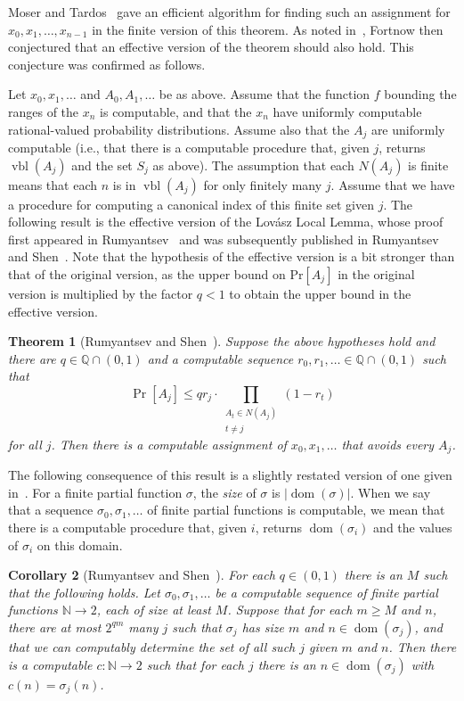 \documentclass{amsart}
\newtheorem{thm}{Theorem}[section]
\newtheorem{cor}[thm]{Corollary}
\theoremstyle{definition}
\renewcommand{\leq}{\leqslant}
\renewcommand{\geq}{\geqslant}
\DeclareMathOperator{\pr}{Pr}
\DeclareMathOperator{\vbl}{vbl}
\DeclareMathOperator{\dom}{dom}
\begin{document}
Moser and Tardos~\cite{MT} gave an efficient algorithm for finding
such an assignment for $x_0, x_1, \dots, x_{n-1}$ in the finite
version of this theorem. As noted in~\cite{RS}, Fortnow then
conjectured that an effective version of the theorem should also
hold. This conjecture was confirmed as follows.

Let $x_0,x_1,\ldots$ and $A_0, A_1,\ldots$ be as above. Assume that
the function $f$ bounding the ranges of the $x_n$ is computable, and
that the $x_n$ have uniformly computable rational-valued probability
distributions. Assume also that the $A_j$ are uniformly computable
(i.e., that there is a computable procedure that, given $j$, returns
$\vbl(A_j)$ and the set $S_j$ as above). The assumption that each
$N(A_j)$ is finite means that each $n$ is in $\vbl(A_j)$ for only
finitely many $j$. Assume that we have a procedure for computing a
canonical index of this finite set given $j$. The following result is
the effective version of the Lov\'asz Local Lemma, whose proof first
appeared in Rumyantsev~\cite{R} and was subsequently published in
Rumyantsev and Shen~\cite{RS}. Note that the hypothesis of the
effective version is a bit stronger than that of the original version,
as the upper bound on Pr$[A_j]$ in the original version is multiplied
by the factor $q < 1$ to obtain the upper bound in the effective
version.

\begin{thm}[Rumyantsev and Shen~\cite{R,RS}]
\label{RSthm}
Suppose the above hypotheses hold and there are $q \in \mathbb Q \cap
(0,1)$ and a computable sequence $r_0,r_1,\ldots \in \mathbb Q \cap
(0,1)$ such that
$$
\pr[A_j] \leq qr_j \cdot \prod_{\substack{A_t \in N(A_j) \\ t \neq j}} (1-r_t)
$$
for all $j$. Then there is a computable assignment of $x_0,x_1,\ldots$
that avoids every $A_j$.
\end{thm}

The following consequence of this result is a slightly restated
version of one given in~\cite[Corollary 7.2]{RS}. For a finite partial
function $\sigma$, the \emph{size} of $\sigma$ is
$|\dom(\sigma)|$. When we say that a sequence
$\sigma_0,\sigma_1,\ldots$ of finite partial functions is computable,
we mean that there is a computable procedure that, given $i$, returns
$\dom(\sigma_i)$ and the values of $\sigma_i$ on this domain.

\begin{cor}[Rumyantsev and Shen~\cite{RS}] 
\label{rscor}
For each $q \in (0,1)$ there is an $M$ such that the following
holds. Let $\sigma_0,\sigma_1,\ldots$ be a computable sequence of
finite partial functions $\mathbb N \rightarrow 2$, each of size at
least $M$. Suppose that for each $m \geq M$ and $n$, there are at most
$2^{qm}$ many $j$ such that $\sigma_j$ has size $m$ and $n \in
\dom(\sigma_j)$, and that we can computably determine the set of all
such $j$ given $m$ and $n$. Then there is a computable $c : \mathbb N
\rightarrow 2$ such that for each $j$ there is an $n \in
\dom(\sigma_j)$ with $c(n)=\sigma_j(n)$.
\end{cor}
\end{document}
